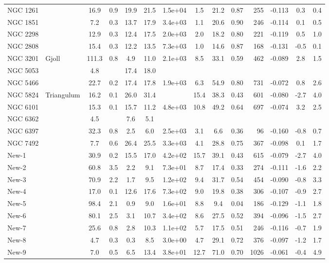\begin{tabular}{llSSSSSSSSrSSS}
NGC 1261 &  & 16.9 & 0.9 & 19.9 & 21.5 & 1.5e+04 & 1.5 & 21.2 & 0.87 & 255 & -0.113 & 0.3 & 0.4 \\
NGC 1851 &  & 7.2 & 0.3 & 13.7 & 17.9 & 3.4e+03 & 1.1 & 20.6 & 0.90 & 246 & -0.114 & 0.1 & 0.5 \\
NGC 2298 &  & 12.9 & 0.3 & 12.4 & 17.5 & 2.0e+03 & 2.0 & 18.2 & 0.80 & 221 & -0.119 & 0.5 & 1.0 \\
NGC 2808 &  & 15.4 & 0.3 & 12.2 & 13.5 & 7.3e+03 & 1.0 & 14.6 & 0.87 & 168 & -0.131 & -0.5 & 0.1 \\
NGC 3201 & Gjoll & 111.3 & 0.8 & 4.9 & 11.0 & 2.1e+03 & 8.5 & 33.1 & 0.59 & 462 & -0.089 & 2.8 & 1.5 \\
NGC 5053 &  & 4.8 &  & 17.4 & 18.0 &  &  &  &  &  &  &  &  \\
NGC 5466 &  & 22.7 & 0.2 & 17.4 & 17.8 & 1.9e+03 & 6.3 & 54.9 & 0.80 & 731 & -0.072 & 0.8 & 2.6 \\
NGC 5824 & Triangulum & 16.2 & 0.1 & 26.0 & 31.4 &  & 15.4 & 38.3 & 0.43 & 601 & -0.080 & -2.7 & 4.0 \\
NGC 6101 &  & 15.3 & 0.1 & 15.7 & 11.2 & 4.8e+03 & 10.8 & 49.2 & 0.64 & 697 & -0.074 & 3.2 & 2.5 \\
NGC 6362 &  & 4.5 &  & 7.6 & 5.1 &  &  &  &  &  &  &  &  \\
NGC 6397 &  & 32.3 & 0.8 & 2.5 & 6.0 & 2.5e+03 & 3.1 & 6.6 & 0.36 & 96 & -0.160 & -0.8 & 0.7 \\
NGC 7492 &  & 7.7 & 0.6 & 26.4 & 25.5 & 3.3e+03 & 4.1 & 28.8 & 0.75 & 367 & -0.098 & 0.1 & 1.7 \\
New-1 &  & 30.9 & 0.2 & 15.5 & 17.0 & 4.2e+02 & 15.7 & 39.1 & 0.43 & 615 & -0.079 & -2.7 & 4.0 \\
New-2 &  & 60.8 & 3.5 & 2.2 & 9.1 & 7.3e+01 & 8.7 & 17.4 & 0.33 & 274 & -0.111 & -1.6 & 2.2 \\
New-3 &  & 70.9 & 2.2 & 1.7 & 9.5 & 1.2e+02 & 9.4 & 31.7 & 0.54 & 454 & -0.090 & -0.8 & 3.3 \\
New-4 &  & 17.0 & 0.1 & 12.6 & 17.6 & 7.3e+02 & 9.0 & 19.8 & 0.38 & 306 & -0.107 & -0.9 & 2.7 \\
New-5 &  & 98.4 & 2.1 & 0.9 & 9.0 & 1.6e+01 & 8.8 & 9.4 & 0.04 & 186 & -0.129 & -1.1 & 1.8 \\
New-6 &  & 80.1 & 2.5 & 3.1 & 10.7 & 3.4e+02 & 8.6 & 27.5 & 0.52 & 394 & -0.096 & -1.5 & 2.7 \\
New-7 &  & 25.6 & 0.8 & 2.8 & 10.3 & 1.1e+02 & 5.7 & 17.5 & 0.51 & 246 & -0.116 & -0.7 & 1.9 \\
New-8 &  & 4.7 & 0.3 & 0.3 & 8.5 & 3.0e+00 & 4.7 & 29.1 & 0.72 & 376 & -0.097 & -1.2 & 1.7 \\
New-9 &  & 7.0 & 0.5 & 6.5 & 13.4 & 3.8e+01 & 12.7 & 71.0 & 0.70 & 1026 & -0.061 & -0.4 & 4.9 \\
\hline
\end{tabular}